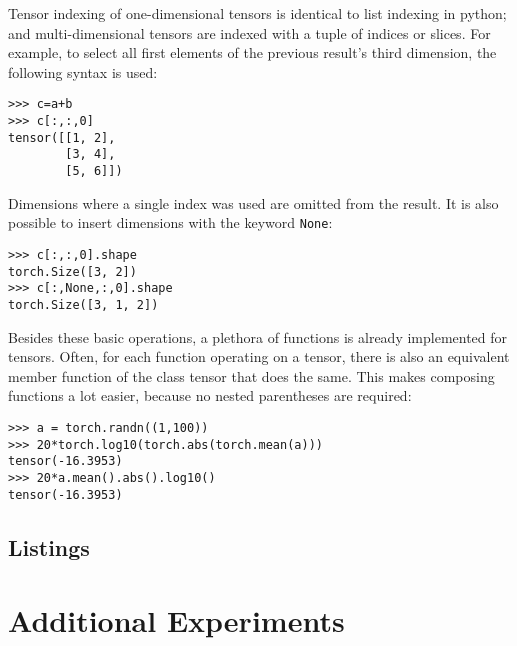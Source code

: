 Tensor indexing of one-dimensional tensors is identical to list indexing in python;
and multi-dimensional tensors are indexed with a tuple of indices or slices.
For example, to select all first elements of the previous result's third dimension, the following syntax is used:
\begin{lstlisting}
>>> c=a+b
>>> c[:,:,0]
tensor([[1, 2],
        [3, 4],
        [5, 6]])
\end{lstlisting}
Dimensions where a single index was used are omitted from the result.
It is also possible to insert dimensions with the keyword \verb|None|:
\begin{lstlisting}
>>> c[:,:,0].shape
torch.Size([3, 2])
>>> c[:,None,:,0].shape
torch.Size([3, 1, 2])
\end{lstlisting}

Besides these basic operations, a plethora of functions is already implemented for tensors.
Often, for each function operating on a tensor,
there is also an equivalent member function of the class tensor that does the same.
This makes composing functions a lot easier, because no nested parentheses are required:
\begin{lstlisting}
>>> a = torch.randn((1,100))
>>> 20*torch.log10(torch.abs(torch.mean(a)))
tensor(-16.3953)
>>> 20*a.mean().abs().log10()
tensor(-16.3953)
\end{lstlisting}

\newpage
\section{Listings}









\chapter{Additional Experiments}